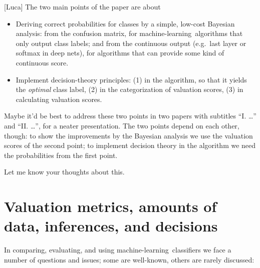 \documentclass[\ifafour a4paper,12pt,\else a5paper,10pt,\fi%
onecolumn,oneside,article,%
british%
]{memoir}
\theoremstyle{remark}
\theoremstyle{innote}
\renewcommand*{\|}[1][]{\nonscript\:#1\vert\nonscript\:\mathopen{}}
\newcommand*{\eg}{{e.g.}}
\newcommand*{\wrench}{{\fontencoding{U}\fontfamily{fontawesomethree}\selectfont\symbol{114}}}
\newcommand{\mynote}[1]{ {\color{notecolour}#1}}
\newcommand*{\ml}{machine-learning}
\begin{document}
\mynote{\scriptsize\wrench [Luca] The two main points of the paper are about
  \begin{itemize}
  \item Deriving correct probabilities for classes by a simple, low-cost Bayesian analysis: from the confusion matrix, for \ml\ algorithms that only output class labels; and from the continuous output (\eg\ last layer or softmax in deep nets), for algorithms that can provide some kind of continuous score.
  \item Implement decision-theory principles: (1) in the algorithm, so that it yields the \emph{optimal} class label, (2) in the categorization of valuation scores, (3) in calculating valuation scores.
  \end{itemize}
  Maybe it'd be best to address these two points in two papers with subtitles \enquote{I. \ldots} and \enquote{II. \ldots}, for a neater presentation. The two points depend on each other, though: to show the improvements by the Bayesian analysis we use the valuation scores of the second point; to implement decision theory in the algorithm we need the probabilities from the first point.

  Let me know your thoughts about this.
}


\section{Valuation metrics, amounts of data, inferences, and decisions}
\label{sec:intro}

In comparing, evaluating, and using \ml\ classifiers we face a number of questions and issues; some are well-known, others are rarely discussed:
\end{document}
